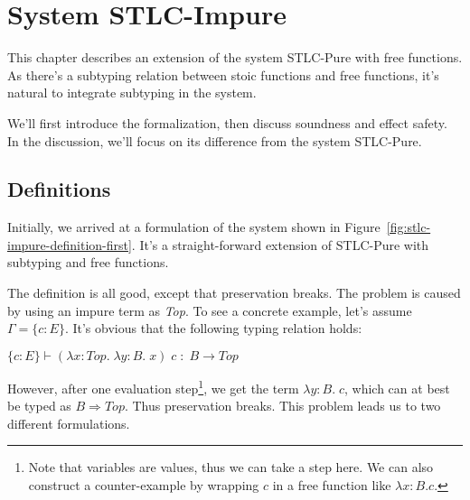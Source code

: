 \section{System STLC-Impure}

This chapter describes an extension of the system STLC-Pure with free
functions. As there's a subtyping relation between stoic functions and
free functions, it's natural to integrate subtyping in the system.

We'll first introduce the formalization, then discuss soundness and
effect safety. In the discussion, we'll focus on its difference from
the system STLC-Pure.

\subsection{Definitions}

Initially, we arrived at a formulation of the system shown in
Figure~\ref{fig:stlc-impure-definition-first}. It's a straight-forward
extension of STLC-Pure with subtyping and free functions.

The definition is all good, except that preservation breaks. The
problem is caused by using an impure term as \emph{Top}. To see a
concrete example, let's assume $\Gamma = \{c:E\}$. It's obvious that
the following typing relation holds:

\begin{center}
  $\{c:E\} \vdash (\lambda x:Top. \; \lambda y:B. \; x) \; c \; : \; B \to Top$
\end{center}

However, after one evaluation step\footnote{Note that variables are
  values, thus we can take a step here. We can also construct a
  counter-example by wrapping $c$ in a free function like
  $\lambda x:B. c$.}, we get the term $\lambda y:B. \; c$, which can
at best be typed as $B \Rightarrow Top$. Thus preservation
breaks. This problem leads us to two different formulations.

